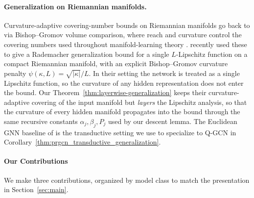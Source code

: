 \documentclass[letterpaper]{article}
\begin{document}
\paragraph{Generalization on Riemannian manifolds.}
Curvature-adaptive covering-number bounds on Riemannian manifolds go back
to \cite{niyogi2008finding} via Bishop--Gromov volume comparison, where
reach and curvature control the covering numbers used throughout
manifold-learning theory \cite{genovese2012minimax, kim2015tight,
fefferman2016testing}. \cite{sarkar2025learning} recently used these to
give a Rademacher generalization bound for a single $L$-Lipschitz function
on a compact Riemannian manifold, with an explicit Bishop--Gromov
curvature penalty $\psi(\kappa,L) = \sqrt{|\kappa|}/L$. In their setting
the network is treated as a single Lipschitz function, so the curvature of
any hidden representation does not enter the bound. Our
Theorem~\ref{thm:layerwise-generalization} keeps their curvature-adaptive
covering of the input manifold but \emph{layers} the Lipschitz analysis,
so that the curvature of every hidden manifold propagates into the bound
through the same recursive constants $\alpha_j, \beta_j, P_j$ used by our
descent lemma. The Euclidean GNN baseline of \cite{tang2023towards} is the
transductive setting we use to specialize to Q-GCN in
Corollary~\ref{thm:prgcn_transductive_generalization}.

\paragraph{Our Contributions}
\label{sec:contrib}

We make three contributions, organized by model class to match the
presentation in Section~\ref{sec:main}.
\end{document}
